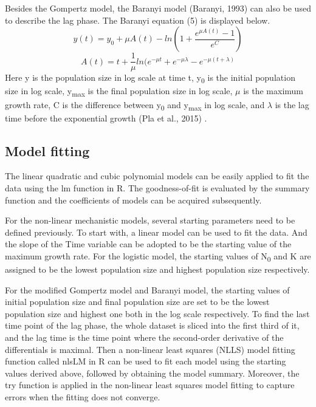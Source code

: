 \documentclass[11pt, a4paper]{article}
\begin{document}
Besides the Gompertz model, the Baranyi model (Baranyi, 1993) \cite{baranyi1993non} can also be used to describe the lag phase. The Baranyi equation (5) is displayed below. 
\begin{equation}
y(t) = y_0 + {\mu}{A(t)} - ln(1 + \frac{e^{{\mu}A(t)}-1}{e^C})
\end{equation}
\begin{equation}
A(t) = t + \frac{1}{\mu}ln(e^{{-\mu}{t}} + e^{{-\mu}{\lambda}} - e^{{-\mu}(t+{\lambda})}
\end{equation}
Here y is the population size in log scale at time t, y\textsubscript{0} is the initial population size in log scale, 
y\textsubscript{max} is the final population size in log scale, 
$\mu$ is the maximum growth rate, C is the difference between 
y\textsubscript{0} and y\textsubscript{max} in log scale, and 
$\lambda$ is the lag time before the exponential growth (Pla et al., 2015) \cite{pla2015comparison}. 


\subsection{Model fitting}
The linear quadratic and cubic polynomial models can be easily applied to fit the data using the lm function in R. The goodness-of-fit is evaluated by the summary function and the coefficients of models can be acquired subsequently.  

For the non-linear mechanistic models, several starting parameters need to be defined previously. To start with, a linear model can be used to fit the data. And the slope of the Time variable can be adopted to be the starting value of the maximum growth rate. For the logistic model, the starting values of N\textsubscript{0} and K are assigned to be the lowest population size and highest population size respectively.  

For the modified Gompertz model and Baranyi model, the starting values of initial population size and final population size are set to be the lowest population size and highest one both in the log scale respectively. To find the last time point of the lag phase, the whole dataset is sliced into the first third of it, and the lag time is the time point where the second-order derivative of the differentials is maximal. Then a non-linear least squares (NLLS) model fitting function called nlsLM in R can be used to fit each model using the starting values derived above, followed by obtaining the model summary. Moreover, the try function is applied in the non-linear least squares model fitting to capture errors when the fitting does not converge. 
\end{document}
